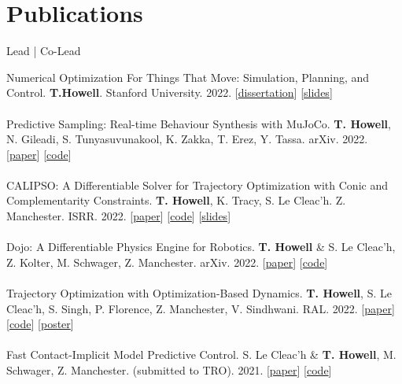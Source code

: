 \documentclass[10pt]{article}
\begin{document}
\section*{Publications}
\begin{center} Lead | Co-Lead \end{center}
Numerical Optimization For Things That Move: Simulation, Planning, and Control. \textbf{T.Howell}. Stanford University. 2022. 
[\href{https://github.com/thowell/thesis/blob/main/main.pdf}{dissertation}]
[\href{https://docs.google.com/presentation/d/1ypalKNcd1hAI59Fur3mFP5FYANqrQ1Smk2gUb-UiBIA/edit?usp=sharing}{slides}]
\\
\\
Predictive Sampling: Real-time Behaviour Synthesis with MuJoCo. \textbf{T. Howell}, N. Gileadi, S. Tunyasuvunakool, K. Zakka, T. Erez, Y. Tassa. arXiv. 2022. 
[\href{https://arxiv.org/abs/2212.00541}{paper}]
[\href{https://github.com/deepmind/mujoco_mpc}{code}]
\\
\\
CALIPSO: A Differentiable Solver for Trajectory Optimization with Conic and Complementarity Constraints. \textbf{T. Howell}, K. Tracy, S. Le Cleac'h. Z. Manchester. ISRR. 2022.
[\href{https://arxiv.org/abs/2205.09255}{paper}]
[\href{https://github.com/thowell/CALIPSO.jl}{code}]
[\href{https://slides.com/taylorhowell/calipso}{slides}]
\\
\\
Dojo: A Differentiable Physics Engine for Robotics. \textbf{T. Howell} \& S. Le Cleac'h, Z. Kolter, M. Schwager, Z. Manchester. arXiv. 2022. 
[\href{https://arxiv.org/abs/2203.00806}{paper}]
[\href{https://github.com/dojo-sim}{code}]
\\
\\
Trajectory Optimization with Optimization-Based Dynamics. \textbf{T. Howell}, S. Le Cleac'h, S. Singh, P. Florence, Z. Manchester, V. Sindhwani. RAL. 2022. 
[\href{https://arxiv.org/abs/2109.04928}{paper}]
[\href{https://github.com/thowell/optimization_dynamics}{code}]
[\href{https://github.com/thowell/cv/blob/master/posters/optimization_dynamics_poster.pdf}{poster}]
\\
\\
Fast Contact-Implicit Model Predictive Control. S. Le Cleac'h \& \textbf{T. Howell}, M. Schwager, Z. Manchester. (submitted to TRO). 2021. 
[\href{https://arxiv.org/abs/2107.05616v2}{paper}]
[\href{https://github.com/thowell/ContactImplicitMPC.jl}{code}]
\\
\\
\end{document}
